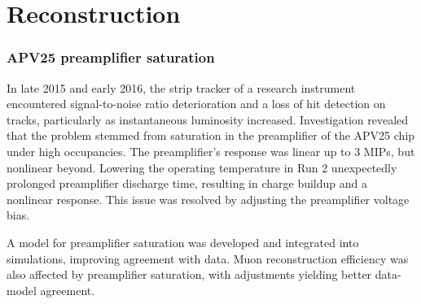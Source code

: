 \chapter{Reconstruction}

\subsection{APV25 preamplifier saturation}
In late 2015 and early 2016, the strip tracker of a research instrument encountered signal-to-noise ratio deterioration and a loss of hit detection on tracks, particularly as instantaneous luminosity increased.
Investigation revealed that the problem stemmed from saturation in the preamplifier of the APV25 chip under high occupancies.
The preamplifier's response was linear up to 3 MIPs, but nonlinear beyond.
Lowering the operating temperature in Run 2 unexpectedly prolonged preamplifier discharge time, resulting in charge buildup and a nonlinear response.
This issue was resolved by adjusting the preamplifier voltage bias.

A model for preamplifier saturation was developed and integrated into simulations, improving agreement with data.
Muon reconstruction efficiency was also affected by preamplifier saturation, with adjustments yielding better data-model agreement.
